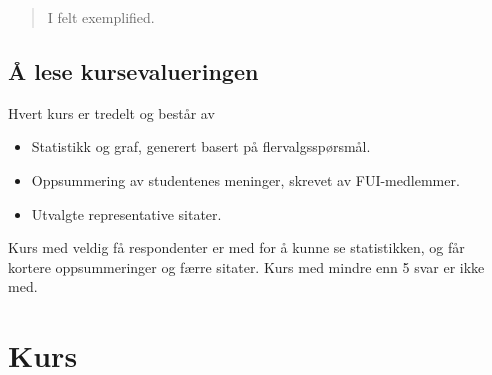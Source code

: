 \documentclass[norsk,a4paper,11pt]{report}
\begin{document}
\begin{quote}
I felt exemplified.
\end{quote}

\section{Å lese kursevalueringen}
Hvert kurs er tredelt og består av
\begin{itemize}
    \item Statistikk og graf, generert basert på flervalgsspørsmål.
    \item Oppsummering av studentenes meninger, skrevet av FUI-medlemmer.
    \item Utvalgte representative sitater.
\end{itemize}
Kurs med veldig få respondenter er med for å kunne se statistikken, og får kortere oppsummeringer og færre sitater.
Kurs med mindre enn 5 svar er ikke med.

\newpage
\chapter{Kurs}
\label{chp:courses}
\newpage
\end{document}
